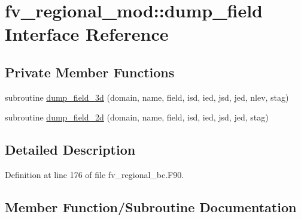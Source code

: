 \section{fv\-\_\-regional\-\_\-mod\-:\-:dump\-\_\-field Interface Reference}
\label{interfacefv__regional__mod_1_1dump__field}
\subsection*{Private Member Functions}
\begin{DoxyCompactItemize}
\item 
subroutine \hyperlink{interfacefv__regional__mod_1_1dump__field_a845cc5470f3fe8a0b98000e3d7a5b718}{dump\-\_\-field\-\_\-3d} (domain, name, field, isd, ied, jsd, jed, nlev, stag)
\item 
subroutine \hyperlink{interfacefv__regional__mod_1_1dump__field_a1001ffc9018efdb3351af058251ecb83}{dump\-\_\-field\-\_\-2d} (domain, name, field, isd, ied, jsd, jed, stag)
\end{DoxyCompactItemize}


\subsection{Detailed Description}


Definition at line 176 of file fv\-\_\-regional\-\_\-bc.\-F90.



\subsection{Member Function/\-Subroutine Documentation}
